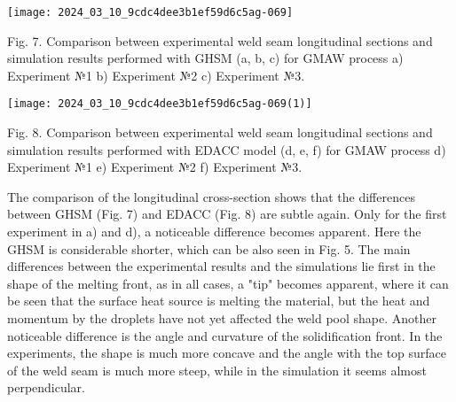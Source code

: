 \documentclass[10pt]{article}
\begin{document}
\begin{center}
\texttt{[image: 2024\_03\_10\_9cdc4dee3b1ef59d6c5ag-069]}
\end{center}

Fig. 7. Comparison between experimental weld seam longitudinal sections and simulation results performed with GHSM (a, b, c) for GMAW process a) Experiment №1 b) Experiment №2 c) Experiment №3.

\begin{center}
\texttt{[image: 2024\_03\_10\_9cdc4dee3b1ef59d6c5ag-069(1)]}
\end{center}

Fig. 8. Comparison between experimental weld seam longitudinal sections and simulation results performed with EDACC model (d, e, f) for GMAW process d) Experiment №1 e) Experiment №2 f) Experiment №3.

The comparison of the longitudinal cross-section shows that the differences between GHSM (Fig. 7) and EDACC (Fig. 8) are subtle again. Only for the first experiment in a) and d), a noticeable difference becomes apparent. Here the GHSM is considerable shorter, which can be also seen in Fig. 5. The main differences between the experimental results and the simulations lie first in the shape of the melting front, as in all cases, a "tip" becomes apparent, where it can be seen that the surface heat source is melting the material, but the heat and momentum by the droplets have not yet affected the weld pool shape. Another noticeable difference is the angle and curvature of the solidification front. In the experiments, the shape is much more concave and the angle with the top surface of the weld seam is much more steep, while in the simulation it seems almost perpendicular.
\end{document}
